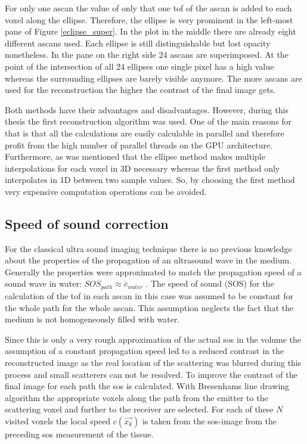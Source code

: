 For only one \ac{ascan} the value of only that one \ac{tof} of the \ac{ascan} is added to each voxel along the ellipse. Therefore, the ellipse is very prominent in the left-most pane of Figure \ref{eclipse_super}. In the plot in the middle there are already eight different \acp{ascan} used. Each ellipse is still distinguishable but lost opacity nonetheless.
In the pane on the right side 24 \acp{ascan} are superimposed. At the point of the intersection of all 24 ellipses one single pixel has a high value whereas the surrounding ellipses are barely visible anymore. The more \acp{ascan} are used for the reconstruction the higher the contrast of the final image gets.

\bigskip

Both methods have their advantages and disadvantages. However, during this thesis the first reconstruction algorithm was used. One of the main reasons for that is that all the calculations are easily calculable in parallel and therefore profit from the high number of parallel threads on the GPU architecture. Furthermore, as was mentioned that the ellipse method makes multiple interpolations for each voxel in 3D necessary whereas the first method only interpolates in 1D between two sample values. So, by choosing the first method very expensive computation operations can be avoided.


\subsection{Speed of sound correction}
\label{sec:sos_correct}

For the classical ultra sound imaging technique there is no previous knowledge about the properties of the propagation of an ultrasound wave in the medium. Generally the properties were approximated to match the propagation speed of a sound wave in water: $SOS_{path} \approx  \bar{c}_{water}$ \cite{Kretzek2014GPUAberration}. The speed of sound (SOS) for the calculation of the \ac{tof} in each \ac{ascan} in this case was assumed to be constant for the whole path for the whole \ac{ascan}. This assumption neglects the fact that the medium is not homogeneously filled with water. 

Since this is only a very rough approximation of the actual \ac{sos} in the volume the assumption of a constant propagation speed led to a reduced contrast in the reconstructed image as the real location of the scattering was blurred during this process and small scatterers can not be resolved.
To improve the contrast of the final image for each path the \ac{sos} is calculated. With Bresenhams line drawing algorithm \cite{Bresenham2010AlgorithmPlotter} the appropriate voxels along the path from the emitter to the scattering voxel and further to the receiver are selected. For each of these $N$ visited voxels the local speed $c(\overrightarrow {x_k})$ is taken from the \ac{sos}-image from the preceding \ac{sos} measurement of the tissue.


